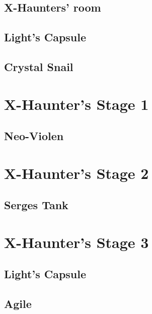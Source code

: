 \subsection{X-Haunters' room}

\subsection{Light's Capsule}\label{X2:Head_parts}

\subsection{Crystal Snail}\label{boss:Crystal_snail}

\section{X-Haunter's Stage 1}

\subsection{Neo-Violen}\label{boss:Neo-Violen}

\section{X-Haunter's Stage 2}

\subsection{Serges Tank}\label{boss:Serges_tank}

\section{X-Haunter's Stage 3}

\subsection{Light's Capsule}\label{X2:Shoryuken}

\subsection{Agile}\label{boss}

